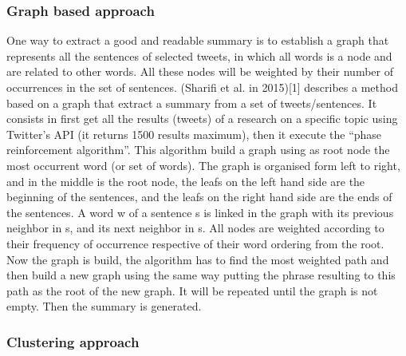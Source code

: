 \documentclass[a4paper, twocolumn]{article}
\begin{document}
\subsubsection{Graph based approach}

One way to extract a good and readable summary is to establish a graph that
represents all the sentences of selected tweets, in which all words is a node
and are related to other words. All these nodes will be weighted by their
number of occurrences in the set of sentences. (Sharifi et al. in 2015)[1]
describes a method based on a graph that extract a summary from a set of
tweets/sentences. It consists in first get all  the results (tweets) of a
research on a specific topic using Twitter’s API (it returns 1500 results
maximum), then it execute the “phase reinforcement algorithm”. This algorithm
build a graph using as root node the most occurrent word (or set of words). The
graph is organised form left to right, and in the middle is the root node, the
leafs on the left hand side are the beginning of the sentences, and the leafs
on the right hand side are the ends of the sentences. A word w of a sentence s
is linked in the graph with its previous neighbor in s, and its next neighbor
in s. All nodes are weighted according to their frequency of occurrence
respective of their word ordering from the root. Now the graph is build, the
algorithm has to find the most weighted path and then build a new graph using
the same way putting the phrase resulting to this path as the root of the new
graph. It will be repeated until the graph is not empty. Then the summary is
generated.

\subsubsection{Clustering approach}
\end{document}
